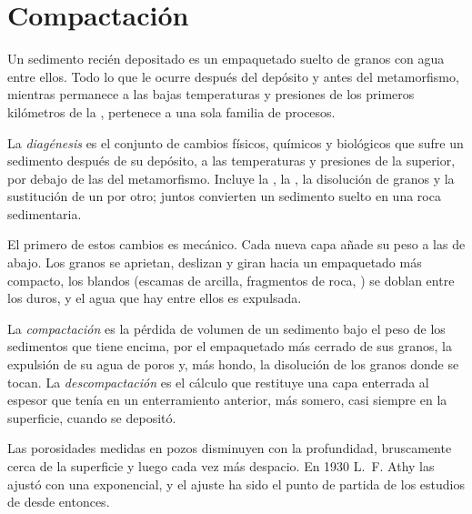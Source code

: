 \section{Compactación}\label{sec:b1:diagenesis-basins:compaction}

Un sedimento recién depositado es un empaquetado suelto de granos con agua entre ellos. Todo lo que le ocurre después del depósito y antes del metamorfismo, mientras permanece a las bajas
temperaturas y presiones de los primeros kilómetros de la , pertenece a una sola familia de procesos.

\begin{definition}[Diagénesis]\label{def:b1:diagenesis-basins:diagenesis}
La \emph{diagénesis} es el conjunto de cambios físicos, químicos y biológicos que sufre un sedimento después de su depósito, a las temperaturas y presiones de la 
superior, por debajo de las del metamorfismo. Incluye la , la , la disolución de granos y la sustitución de un  por otro; juntos convierten un sedimento suelto en una roca sedimentaria.
\end{definition}

El primero de estos cambios es mecánico. Cada nueva capa añade su peso a las de abajo. Los granos se aprietan, deslizan y giran hacia un empaquetado más compacto, los blandos (escamas de arcilla,
fragmentos de roca, ) se doblan entre los duros, y el agua que hay entre ellos es expulsada.

\begin{definition}\label{def:b1:diagenesis-basins:compaction}
La \emph{compactación} es la pérdida de volumen de un sedimento bajo el peso de los sedimentos que tiene encima, por el empaquetado más cerrado de sus granos, la expulsión
de su agua de poros y, más hondo, la disolución de los granos donde se tocan. La \emph{descompactación} es el cálculo que restituye una capa enterrada al espesor que tenía
en un enterramiento anterior, más somero, casi siempre en la superficie, cuando se depositó.
\end{definition}

Las porosidades medidas en pozos disminuyen con la profundidad, bruscamente cerca de la superficie y luego cada vez más despacio. En 1930 L.~F. Athy las ajustó con una exponencial, y el ajuste ha sido
el punto de partida de los estudios de  desde entonces.

